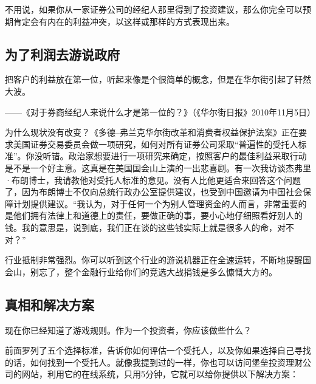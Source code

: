 不用说，如果你从一家证券公司的经纪人那里得到了投资建议，那么你完全可以预期肯定会有内在的利益冲突，以这样或那样的方式表现出来。

\subsection{为了利润去游说政府}

\begin{BookQuote}
把客户的利益放在第一位，听起来像是个很简单的概念，但是在华尔街引起了轩然大波。

\hfill ——《对于券商经纪人来说什么才是第一位的？》（《华尔街日报》2010年11月5日）
\end{BookQuote}

为什么现状没有改变？《多德–弗兰克华尔街改革和消费者权益保护法案》正在要求美国证券交易委员会做一项研究，如何对所有证券公司采取“普遍性的受托人标准”。你没听错。政治家想要进行一项研究来确定，按照客户的最佳利益采取行动是不是一个好主意。这真是在美国国会山上演的一出悲喜剧。有一次我访谈杰弗里·布朗博士，我请教他对受托人标准的意见。没有人比他更适合来回答这个问题了，因为布朗博士不仅向总统行政办公室提供建议，也受到中国邀请为中国社会保障计划提供建议。“我认为，对于任何一个为别人管理资金的人而言，非常重要的是他们拥有法律上和道德上的责任，要做正确的事，要小心地仔细照看好别人的钱。我的意思是，说到底，我们正在谈的这些钱实际上就是很多人的命，对不对？”

行业抵制非常强烈。你可以听到这个行业的游说机器正在全速运转，不断地提醒国会山，别忘了，整个金融行业给你们的竞选大战捐钱是多么慷慨大方的。

\subsection{真相和解决方案}

现在你已经知道了游戏规则。作为一个投资者，你应该做些什么？

前面罗列了五个选择标准，告诉你如何评估一个受托人，以及你如果选择自己寻找的话，如何找到一个受托人。就像我提到过的一样，你也可以访问堡垒投资理财公司的网站，利用它的在线系统，只用5分钟，它就可以给你提供以下解决方案：

